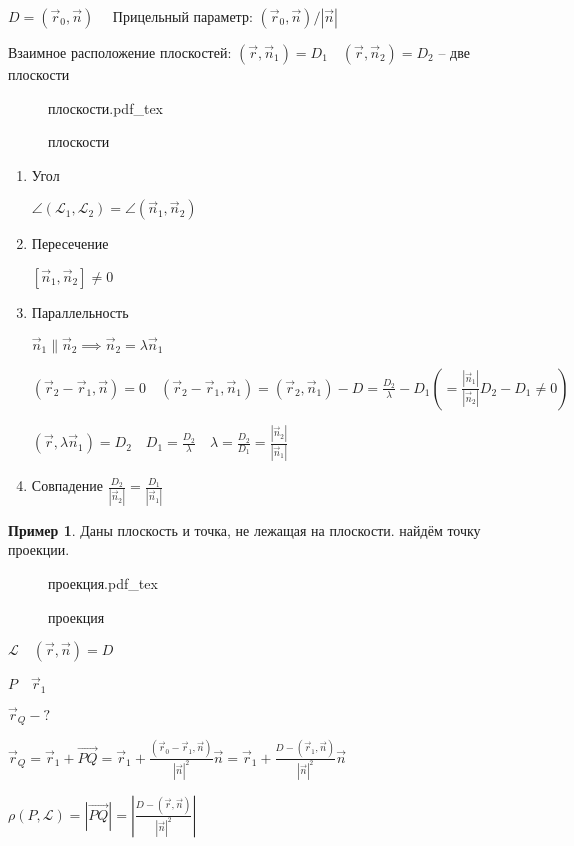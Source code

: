 \documentclass{book}
\theoremstyle{definition}
\newtheorem*{example}{Пример}
\newcommand\vect[1]{\overset{\longrightarrow}{#1}}
\newcommand{\incfig}[1]{%
    \def\svgwidth{\columnwidth}
    {#1.pdf_tex}
}
\begin{document}
$D = \left( \vec r_0, \vec n \right)\quad $ Прицельный параметр: $ \left( \vec r_0, \vec n \right) / \left| \vec n \right| $

Взаимное расположение плоскостей:
$(\vec r, \vec n_1) = D_1\quad (\vec r, \vec n_2)=D_2$ -- две плоскости

\begin{figure}[ht]
    \centering
    \incfig{плоскости}
    \caption{плоскости}
    \label{fig:плоскости}
\end{figure}
\begin{enumerate}
    \item Угол

        $\angle \left( \mathscr L_1, \mathscr L_2 \right)  = \angle\left( \vec n_1, \vec n_2 \right) $
    \item Пересечение

        $\left[ \vec n_1, \vec n_2 \right] \neq 0$
    \item Параллельность

        $\vec n_1 \parallel \vec n_2\implies \vec n_2 = \lambda \vec n_1$

        $\left( \vec r_2-\vec r_1, \vec n \right) =0\quad \left( \vec r_2-\vec r_1, \vec n_1 \right)  = \left( \vec r_2, \vec n_1 \right) -D = \frac{D_2}{\lambda} - D_1 \left( = \frac{\left| \vec n_1 \right| }{\left| \vec n_2 \right| }D_2-D_1\neq 0  \right) $ 

        $\left( \vec r, \lambda \vec n_1 \right) =D_2\quad D_1 = \frac{D_2}{\lambda}\quad \lambda = \frac{D_2}{D_1} = \frac{\left| \vec n_2 \right| }{\left| \vec n_1 \right| }$
    \item Совпадение
        $\frac{D_2}{\left| \vec n_2 \right| } = \frac{D_1}{\left| \vec n_1 \right| }$
\end{enumerate}

\begin{example}
    Даны плоскость и точка, не лежащая на плоскости. найдём точку проекции.

\begin{figure}[ht]
    \centering
    \incfig{проекция}
    \caption{проекция}
    \label{fig:проекция}
\end{figure}

$\mathscr L\quad \left( \vec r, \vec n \right) =D$

$P\quad \vec r_1$

$\vec r_Q -?$

$\vec r_Q = \vec r_1 + \vect{PQ} = \vec r_1 + \frac{\left( \vec r_0-\vec r_1, \vec n \right) }{\left| \vec n \right| ^2}\vec n = \vec r_1 + \frac{D - \left( \vec r_1, \vec n \right) }{\left| \vec n \right| ^2}\vec n$ 

$\rho\left( P, \mathscr L \right)  = \left| \vect{PQ} \right|  = \left| \frac{D-\left( \vec r, \vec n \right) }{|\vec n|^2} \right| $ 


\end{example}
\end{document}
